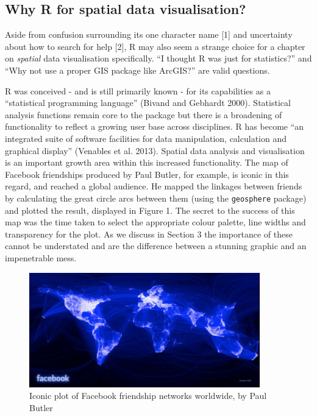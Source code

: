 \documentclass[]{article}
\let\Oldincludegraphics\includegraphics
\renewcommand{\includegraphics}[1]{\Oldincludegraphics[width=10cm]{#1}}
\begin{document}
\subsection{Why R for spatial data visualisation?}

Aside from confusion surrounding its one character name {[}1{]} and
uncertainty about how to search for help {[}2{]}, R may also seem a
strange choice for a chapter on \emph{spatial} data visualisation
specifically. ``I thought R was just for statistics?'' and ``Why not use
a proper GIS package like ArcGIS?'' are valid questions.

R was conceived - and is still primarily known - for its capabilities as
a ``statistical programming language'' (Bivand and Gebhardt 2000).
Statistical analysis functions remain core to the package but there is a
broadening of functionality to reflect a growing user base across
disciplines. R has become ``an integrated suite of software facilities
for data manipulation, calculation and graphical display'' (Venables et
al. 2013). Spatial data analysis and visualisation is an important
growth area within this increased functionality. The map of Facebook
friendships produced by Paul Butler, for example, is iconic in this
regard, and reached a global audience. He mapped the linkages between
friends by calculating the great circle arcs between them (using the
\texttt{geosphere} package) and plotted the result, displayed in Figure
1. The secret to the success of this map was the time taken to select
the appropriate colour palette, line widths and transparency for the
plot. As we discuss in Section 3 the importance of these cannot be
understated and are the difference between a stunning graphic and an
impenetrable mess.

\begin{figure}[htbp]
\centering
\includegraphics{figure/butler_facebook_2.jpg}
\caption{Iconic plot of Facebook friendship networks worldwide, by Paul
Butler}
\end{figure}
\end{document}
